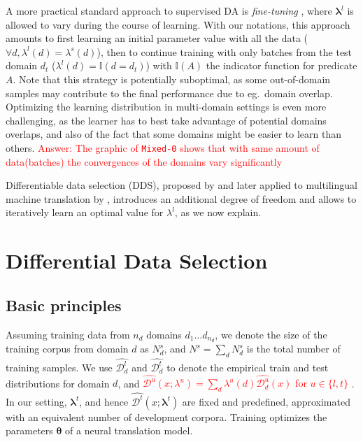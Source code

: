 \documentclass[11pt,a4paper]{article}
\newcommand{\fyTodo}[1]{\Todo[FY:]{\textcolor{orange}{#1}}}
\newcommand{\revision}[1]{\textcolor{red}{#1}}
\newcommand{\system}[1]{\texttt{{#1}}}
\newcommand{\vlambda}{\ensuremath{\boldsymbol\lambda}\xspace} %
\newcommand{\vtheta}{\ensuremath{\boldsymbol\theta}\xspace} %
\newcommand{\indic}[1]{\ensuremath{\mathbb{I}(#1)}}
\begin{document}
A more practical standard approach to supervised DA is \emph{fine-tuning} \cite{Luong15stanford,Freitag16fast}, where $\vlambda^{l}$ is allowed to vary during the course of learning. With our notations, this approach amounts to first learning an initial parameter value with all the data ($\forall d, \lambda^{l}(d) = \lambda^{s}(d)$), then to continue training with only batches from the test domain $d_t$ ($\lambda^{l}(d) = \indic{d = d_t}$) with $\indic{A}$ the indicator function for predicate $A$. Note that this strategy is potentially suboptimal, as some out-of-domain samples may contribute to the final performance due to eg.\ domain overlap. Optimizing the learning distribution in multi-domain settings is even more challenging, as the learner has to best take advantage of potential domains overlaps, and also of the fact that some domains might be easier to learn than others.\fyTodo{How to measure this?} \revision{Answer: The graphic of \system{Mixed-0} shows that with same amount of data(batches) the convergences of the domains vary significantly}

Differentiable data selection (DDS), proposed by \citet{Wang20optimizing} and later applied to multilingual machine translation by \citet{Wang20balancing}, introduces an additional degree of freedom and allows to iteratively learn an optimal value for $\lambda^{l}$, as we now explain.


\section{Differential Data Selection} \label{sec:dds}
\subsection{Basic principles}
Assuming training data from $n_d$ domains $d_1 \dots d_{n_d}$, we denote the size of the training corpus from domain $d$ as  $N^{s}_d$, and $N^{s} = \sum_d N^{s}_d$ is the total number of training samples. We use $\widehat{\mathcal{D}^l_d}$ and $\widehat{\mathcal{D}^t _d}$ to denote the empirical train and test distributions for domain $d$, and \revision{$\widehat{\mathcal{D}^{u}}(x;\lambda^{u}) = \sum_{d} \lambda^{u}(d) \widehat{\mathcal{D}^{u}_d}(x)$ for $u\in\{l,t\}$} \fyTodo{$\widehat{\mathcal{D}}(x;\lambda) = \sum_{d} \lambda(d) \widehat{\mathcal{D}_d}(x)$}. In our setting,  $\vlambda^t$, and hence $\widehat{\mathcal{D}^t}(x;\vlambda^t)$ are fixed and predefined, approximated with an equivalent number of development corpora. Training optimizes the parameters $\vtheta$ of a neural translation model.
\end{document}
